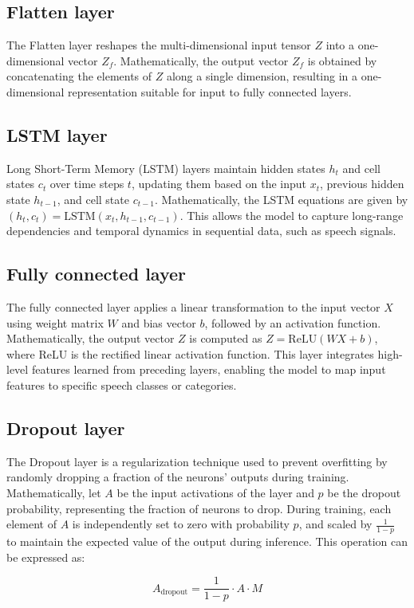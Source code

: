 \documentclass[a4paper]{report}
\begin{document}
{\subsection{Flatten layer}
The Flatten layer reshapes the multi-dimensional input tensor $Z$ into a one-dimensional vector $Z_f$. Mathematically, the output vector $Z_f$ is obtained by concatenating the elements of $Z$ along a single dimension, resulting in a one-dimensional representation suitable for input to fully connected layers.

\subsection{LSTM layer}
Long Short-Term Memory (LSTM) layers maintain hidden states $h_t$ and cell states $c_t$ over time steps $t$, updating them based on the input $x_t$, previous hidden state $h_{t-1}$, and cell state $c_{t-1}$. Mathematically, the LSTM equations are given by $(h_t, c_t) = \text{LSTM}(x_t, h_{t-1}, c_{t-1})$. This allows the model to capture long-range dependencies and temporal dynamics in sequential data, such as speech signals.

\subsection{Fully connected layer}
The fully connected layer applies a linear transformation to the input vector $X$ using weight matrix $W$ and bias vector $b$, followed by an activation function. Mathematically, the output vector $Z$ is computed as $Z = \text{ReLU}(WX + b)$, where ReLU is the rectified linear activation function. This layer integrates high-level features learned from preceding layers, enabling the model to map input features to specific speech classes or categories.
\subsection{Dropout layer}
The Dropout layer is a regularization technique used to prevent overfitting by randomly dropping a fraction of the neurons' outputs during training. Mathematically, let $A$ be the input activations of the layer and $p$ be the dropout probability, representing the fraction of neurons to drop. During training, each element of $A$ is independently set to zero with probability $p$, and scaled by $\frac{1}{1-p}$ to maintain the expected value of the output during inference. This operation can be expressed as:

\[
A_{\text{dropout}} = \frac{1}{1-p} \cdot A \cdot M
\]

}
\end{document}
